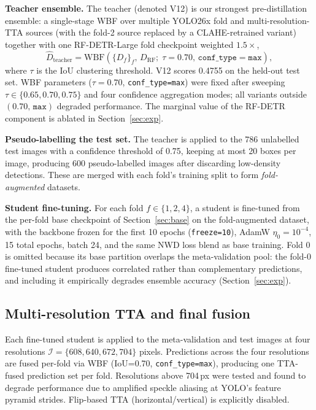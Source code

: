 \documentclass{article}
\begin{document}
\textbf{Teacher ensemble.} The teacher (denoted V12) is our strongest
pre-distillation ensemble: a single-stage WBF over
multiple YOLO26x fold and multi-resolution-TTA sources (with the
fold-2 source replaced by a CLAHE-retrained variant) together with one
RF-DETR-Large \cite{roboflow2024rfdetr} fold checkpoint weighted
$1.5\times$,
\begin{equation}
  \hat D_{\mathrm{teacher}}
  = \mathrm{WBF}\!\left(\{D_f\}_{f},\,D_{\mathrm{RF}};\;\tau{=}0.70,\,
    \texttt{conf\_type}{=}\texttt{max}\right),
\end{equation}
where $\tau$ is the IoU clustering threshold. V12 scores 0.4755 on the
held-out test set. WBF parameters ($\tau{=}0.70$,
\texttt{conf\_type=max}) were fixed after sweeping
$\tau\!\in\!\{0.65,0.70,0.75\}$ and four confidence aggregation modes;
all variants outside $(0.70,\,\texttt{max})$ degraded performance. The
marginal value of the RF-DETR component is ablated in
Section~\ref{sec:exp}.

\textbf{Pseudo-labelling the test set.} The teacher is applied to the
786 unlabelled test images with a confidence threshold of 0.75,
keeping at most 20 boxes per image, producing 600 pseudo-labelled
images after discarding low-density detections. These are merged with
each fold's training split to form \emph{fold-augmented} datasets.

\textbf{Student fine-tuning.} For each fold $f\in\{1,2,4\}$, a student
is fine-tuned from the per-fold base checkpoint of
Section~\ref{sec:base} on the fold-augmented dataset, with the
backbone frozen for the first 10 epochs (\texttt{freeze=10}), AdamW \cite{loshchilov2019adamw}
$\eta_0{=}10^{-4}$, 15 total epochs, batch 24, and the same NWD loss
blend as base training. Fold 0 is omitted because its base partition
overlaps the meta-validation pool: the fold-0 fine-tuned student
produces correlated rather than complementary predictions, and
including it empirically degrades ensemble accuracy
(Section~\ref{sec:exp}).

\subsection{Multi-resolution TTA and final fusion}

Each fine-tuned student is applied to the meta-validation and test
images at four resolutions $\mathcal{I}=\{608,640,672,704\}$ pixels.
Predictions across the four resolutions are fused per-fold via WBF
(IoU=0.70, \texttt{conf\_type=max}), producing one TTA-fused
prediction set per fold. Resolutions above 704\,px were tested and
found to degrade performance due to amplified speckle aliasing at
YOLO's feature pyramid strides. Flip-based TTA (horizontal/vertical)
is explicitly disabled.
\end{document}
